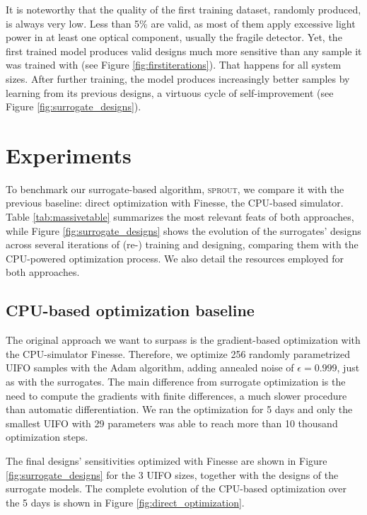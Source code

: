 \documentclass[a4paper,twocolumn,11pt,unpublished]{quantumarticle}
\newcommand{\algorithm}{\textsc{sprout}}
\begin{document}
It is noteworthy that the quality of the first training dataset, randomly produced, is always very low. Less than 5\% are valid, as most of them apply excessive light power in at least one optical component, usually the fragile detector. Yet, the first trained model produces valid designs much more sensitive than any sample it was trained with (see Figure \ref{fig:firstiterations}). That happens for all system sizes. After further training, the model produces increasingly better samples by learning from its previous designs, a virtuous cycle of self-improvement (see Figure \ref{fig:surrogate_designs}).


\section{Experiments}
To benchmark our surrogate-based algorithm, \algorithm, we compare it with the previous baseline: direct optimization with Finesse, the CPU-based simulator. Table \ref{tab:massivetable} summarizes the most relevant feats of both approaches, while Figure \ref{fig:surrogate_designs} shows the evolution of the surrogates' designs across several iterations of (re-) training and designing, comparing them with the CPU-powered optimization process. We also detail the resources employed for both approaches.

\subsection{CPU-based optimization baseline}\label{sec:baseline}
The original approach we want to surpass is the gradient-based optimization with the CPU-simulator Finesse. Therefore, we optimize 256 randomly parametrized UIFO samples with the Adam algorithm, adding annealed noise of $\epsilon=0.999$, just as with the surrogates. The main difference from surrogate optimization is the need to compute the gradients with finite differences, a much slower procedure than automatic differentiation. We ran the optimization for 5 days and only the smallest UIFO with 29 parameters was able to reach more than 10 thousand optimization steps.

The final designs' sensitivities optimized with Finesse are shown in Figure \ref{fig:surrogate_designs} for the 3 UIFO sizes, together with the designs of the surrogate models. The complete evolution of the CPU-based optimization over the 5 days is shown in Figure \ref{fig:direct_optimization}.
\end{document}
